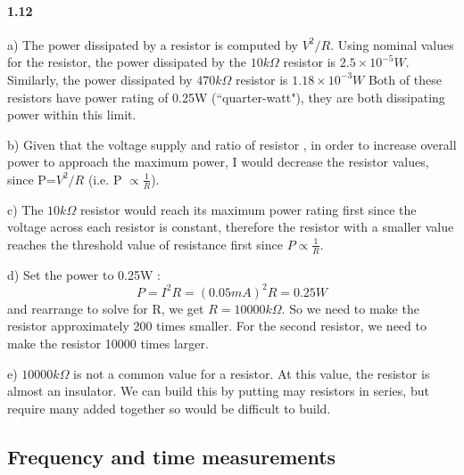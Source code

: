 \documentclass[authoryear, 12pt,5p, times]{elsarticle}
\begin{document}
\paragraph{\textbf{1.12}}
\par a) The power dissipated by a resistor is computed by $V^2/R$. Using nominal values for the resistor, the power dissipated by the \(10 k\Omega\) resistor is \(2.5 \times 10^{-5} W \). Similarly, the power dissipated by \(470 k\Omega \) resistor is \(  1.18 \times 10^{-3} W\)
Both of these resistors have power rating of 0.25W (``quarter-watt"), they are both dissipating power within this limit. 
\par b) Given that the  voltage supply and ratio of resistor ,  in order to increase overall power to approach the maximum power, I would decrease the resistor values, since  P=$V^2/R$ (i.e. P \(\propto \frac{1}{R} \)). 
\par c) The \(10k\Omega\) resistor would reach its maximum power rating first since the voltage across each resistor is constant, therefore the resistor with a smaller value reaches the threshold value of resistance first since \(P \propto \frac{1}{R}\).  
\par d) Set the power to 0.25W :
\begin{equation*}
P = I^2R = (0.05mA)^2R=0.25W
\end{equation*}
and rearrange to solve for R, we get \(R = 10000k\Omega\). So we need to make the resistor approximately 200 times smaller. For the second resistor, we need to make the resistor 10000 times larger.
\par  e)  $10000k\Omega$ is not a common value for a resistor. At this value, the resistor is almost an insulator. We can build this by putting may resistors in series, but require many added together so  would be difficult to build.%
\subsection*{Frequency and time measurements}
\end{document}
